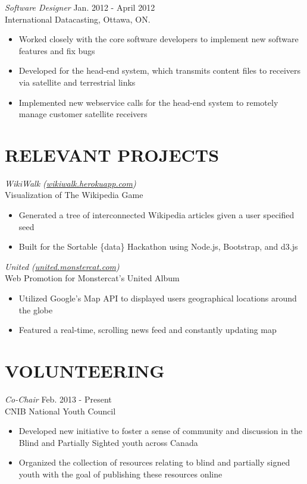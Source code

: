 \documentclass[margin]{res}
\begin{document}
\begin{resume}
{\sl Software Designer} \hfill Jan. 2012 - April 2012 \\
International Datacasting, Ottawa, ON.
\begin{itemize}  \itemsep -2pt %
  \item Worked closely with the core software developers to implement new software features and fix bugs
  \item Developed for the head-end system, which transmits content files to receivers via satellite and terrestrial links
  \item Implemented new webservice calls for the head-end system to remotely manage customer satellite receivers
\end{itemize}

\section{RELEVANT PROJECTS}

{\sl WikiWalk (\href{http://wikiwalk.herokuapp.com}{wikiwalk.herokuapp.com}) } \\
Visualization of The Wikipedia Game
\begin{itemize} \itemsep -2pt
  \item Generated a tree of interconnected Wikipedia articles given a user specified seed
  \item Built for the Sortable \{data\} Hackathon using Node.js, Bootstrap, and d3.js
\end{itemize}

{\sl United (\href{http://united.monstercat.com}{united.monstercat.com}) } \\
Web Promotion for Monstercat's United Album
\begin{itemize} \itemsep -2pt
  \item Utilized Google's Map API to displayed users geographical locations around the globe
  \item Featured a real-time, scrolling news feed and constantly updating map
\end{itemize}

\section{VOLUNTEERING}
{\sl Co-Chair} \hfill Feb. 2013 - Present\\
CNIB National Youth Council
\begin{itemize}\itemsep -2pt
  \item Developed new initiative to foster a sense of community and discussion in the Blind and Partially Sighted youth across Canada
  \item Organized the collection of resources relating to blind and partially signed youth with the goal of publishing these resources online
\end{itemize}


\end{resume}
\end{document}
